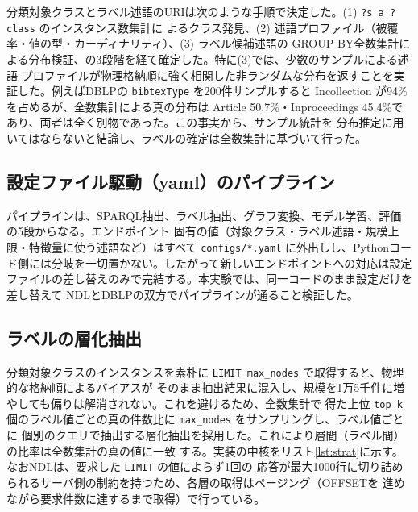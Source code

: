 \documentclass[dvipdfmx,twoside,11pt]{article}
\begin{document}
分類対象クラスとラベル述語のURIは次のような手順で決定した。(1) \texttt{?s a ?class} のインスタンス数集計に
よるクラス発見、(2) 述語プロファイル（被覆率・値の型・カーディナリティ）、(3) ラベル候補述語の
GROUP BY全数集計による分布検証、の3段階を経て確定した。特に(3)では、少数のサンプルによる述語
プロファイルが物理格納順に強く相関した非ランダムな分布を返すことを実証した。例えばDBLPの
\texttt{bibtexType} を200件サンプルすると Incollection が94\%を占めるが、全数集計による真の分布は
Article 50.7\%・Inproceedings 45.4\%であり、両者は全く別物であった。この事実から、サンプル統計を
分布推定に用いてはならないと結論し、ラベルの確定は全数集計に基づいて行った。

\subsection{設定ファイル駆動（yaml）のパイプライン}

パイプラインは、SPARQL抽出、ラベル抽出、グラフ変換、モデル学習、評価の5段からなる。エンドポイント
固有の値（対象クラス・ラベル述語・規模上限・特徴量に使う述語など）はすべて \texttt{configs/*.yaml}
に外出しし、Pythonコード側には分岐を一切置かない。したがって新しいエンドポイントへの対応は設定
ファイルの差し替えのみで完結する。本実験では、同一コードのまま設定だけを差し替えて
NDLとDBLPの双方でパイプラインが通ること検証した。

\subsection{ラベルの層化抽出}

分類対象クラスのインスタンスを素朴に \texttt{LIMIT max\_nodes} で取得すると、物理的な格納順によるバイアスが
そのまま抽出結果に混入し、規模を1万5千件に増やしても偏りは解消されない。これを避けるため、全数集計で
得た上位 \texttt{top\_k} 個のラベル値ごとの真の件数比に \texttt{max\_nodes} をサンプリングし、ラベル値ごとに
個別のクエリで抽出する層化抽出を採用した。これにより層間（ラベル間）の比率は全数集計の真の値に一致
する。実装の中核をリスト\ref{lst:strat}に示す。なおNDLは、要求した \texttt{LIMIT} の値によらず1回の
応答が最大1000行に切り詰められるサーバ側の制約を持つため、各層の取得はページング（OFFSETを
進めながら要求件数に達するまで取得）で行っている。
\end{document}
